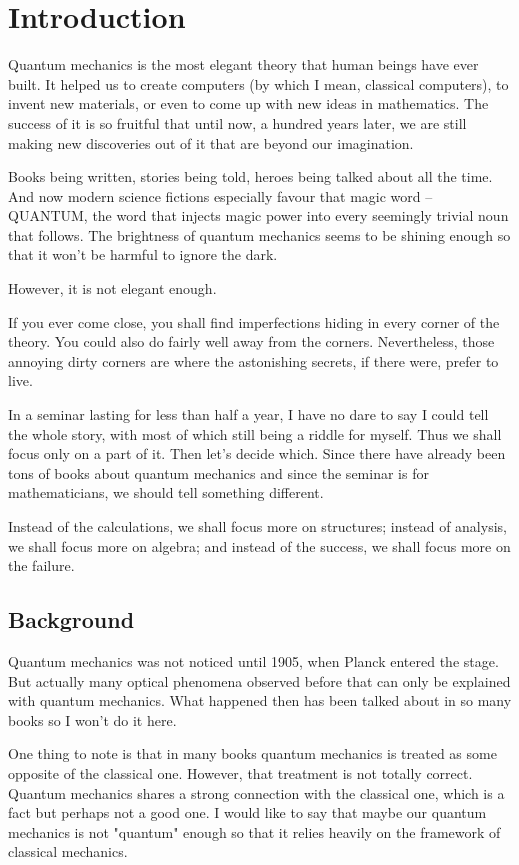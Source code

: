 \section{Introduction}
Quantum mechanics is the most elegant theory that human beings have ever built. It helped us to create computers (by which I mean, classical computers), to invent new materials, or even to come up with new ideas in mathematics. The success of it is so fruitful that until now, a hundred years later, we are still making new discoveries out of it that are beyond our imagination.

Books being written, stories being told, heroes being talked about all the time. And now modern science fictions especially favour that magic word -- QUANTUM, the word that injects magic power into every seemingly trivial noun that follows. The brightness of quantum mechanics  seems to be shining enough so that it won't be harmful to ignore the dark.

However, it is not elegant enough.

If you ever come close, you shall find imperfections hiding in every corner of the theory. You could also do fairly well away from the corners. Nevertheless, those annoying dirty corners are where the astonishing secrets, if there were, prefer to live.

In a seminar lasting for less than half a year, I have no dare to say I could tell the whole story, with most of which still being a riddle for myself. Thus we shall focus only on a part of it. Then let's decide which. Since there have already been tons of books about quantum mechanics and since the seminar is for mathematicians, we should tell something different.

Instead of the calculations, we shall focus more on structures; instead of analysis, we shall focus more on algebra; and instead of the success, we shall focus more on the failure.

\subsection{Background}
Quantum mechanics was not noticed until 1905, when Planck entered the stage. But actually many optical phenomena observed before that can only be explained with quantum mechanics. What happened then has been talked about in so many books so I won't do it here.

One thing to note is that in many books quantum mechanics is treated as some opposite of the classical one. However, that treatment is not totally correct. Quantum mechanics shares a strong connection with the classical one, which is a fact but perhaps not a good one. I would like to say that maybe our quantum mechanics is not "quantum" enough so that it relies heavily on the framework of classical mechanics.

